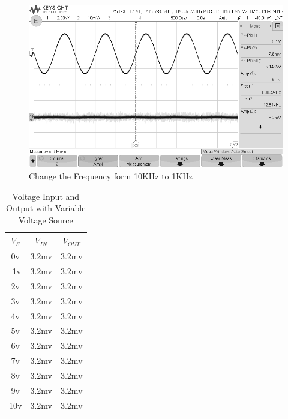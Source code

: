 \documentclass[journal, letterpaper]{IEEEtran}
\begin{document}
        \begin{figure}[!hbt]
    \begin{center}
    \includegraphics[width=\columnwidth]{scope_19}
    \caption{Change the Frequency form 10KHz to 1KHz}
    \label{fig:scope_19}
    \end{center}
    \end{figure}
	\begin{table}[!hbt]
		\begin{center}
		\caption{Voltage Input and Output with Variable Voltage Source}
		\label{tab:VIOVVS}
		\begin{tabular}{|c|c|c|}
			\hline
			 \textbf{$V_S$} & \textbf{$V_{IN}$} & \textbf{$V_{OUT}$}\\
			\hline
			0v &3.2mv & 3.2mv\\
			\hline
\(\)	1v &3.2mv & 3.2mv\\
			\hline
			2v &3.2mv & 3.2mv\\
			\hline
            3v &3.2mv & 3.2mv\\
			\hline
            4v &3.2mv & 3.2mv\\
			\hline
            5v &3.2mv & 3.2mv\\
			\hline
            6v &3.2mv & 3.2mv\\
			\hline
            7v &3.2mv & 3.2mv\\
			\hline
            8v &3.2mv & 3.2mv\\
			\hline
            9v &3.2mv & 3.2mv\\
			\hline
            10v &3.2mv & 3.2mv\\
			\hline
            
		\end{tabular}
		\end{center}
        \end{table}
        \newpage
\end{document}
